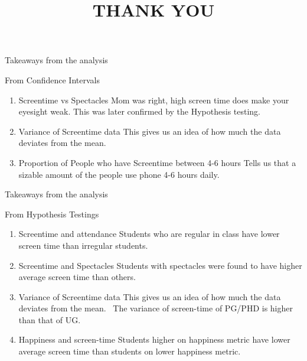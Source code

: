 \documentclass{beamer}
\begin{document}
\begin{frame}{Takeaways from the analysis}
\begin{block}{From Confidence Intervals}
 \begin{enumerate}
    \item{Screentime vs Spectacles}
    \newline Mom was right, high screen time does make your eyesight weak. This was later confirmed by the Hypothesis testing.
    \item{Variance of Screentime data}
    \newline This gives us an idea of how much the data deviates from the mean.
    \item{Proportion of People who have Screentime between 4-6 hours}
    \newline Tells us that a sizable amount of the people use phone 4-6 hours daily.
\end{enumerate}
\end{block}
\end{frame}

\begin{frame}{Takeaways from the analysis}
\begin{block}{From Hypothesis Testings}
 \begin{enumerate}
    \item{Screentime and attendance}
    \newline Students who are regular in class have lower screen time than irregular students.
    \item{Screentime and Spectacles}
    \newline Students with spectacles were found to have higher average screen time than others.
    \item{Variance of Screentime data}
    \newline This gives us an idea of how much the data deviates from the mean.
    \ The variance of screen-time of PG/PHD is higher than that of UG.
    \item{Happiness and screen-time}
    \newline Students higher on happiness metric have lower average screen time than students on lower happiness metric.
\end{enumerate}
\end{block}
\end{frame}

\title{THANK YOU}
\begin{frame}
    \maketitle
\end{frame}
\end{document}
